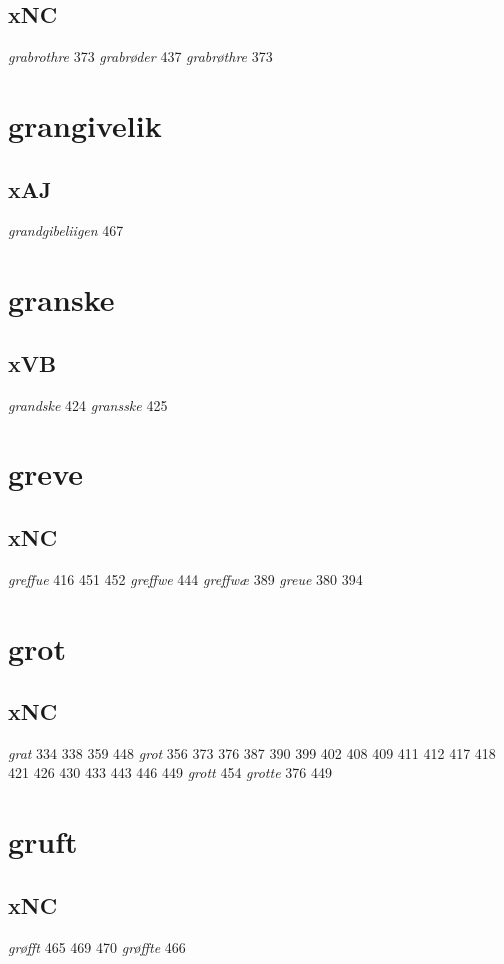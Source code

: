 \documentclass[a4paper,twocolumn]{article}
\begin{document}
\subsection{xNC}
\label{sec:org898f5ee}
\emph{grabrothre} 373 \emph{grabrøder} 437 \emph{grabrøthre} 373 
\section{grangivelik}
\label{sec:orgd116047}
\subsection{xAJ}
\label{sec:org1b1bb13}
\emph{grandgibeliigen} 467 
\section{granske}
\label{sec:org24508a1}
\subsection{xVB}
\label{sec:orgb444785}
\emph{grandske} 424 \emph{gransske} 425 
\section{greve}
\label{sec:org2be4f91}
\subsection{xNC}
\label{sec:org3eb3c4a}
\emph{greffue} 416 451 452 \emph{greffwe} 444 \emph{greffwæ} 389 \emph{greue} 380 394 
\section{grot}
\label{sec:orgeae629e}
\subsection{xNC}
\label{sec:org8572f84}
\emph{grat} 334 338 359 448 \emph{grot} 356 373 376 387 390 399 402 408 409 411 412 417 418 421 426 430 433 443 446 449 \emph{grott} 454 \emph{grotte} 376 449 
\section{gruft}
\label{sec:orgf42cd5d}
\subsection{xNC}
\label{sec:orged9ffa0}
\emph{grøfft} 465 469 470 \emph{grøffte} 466 
\end{document}
